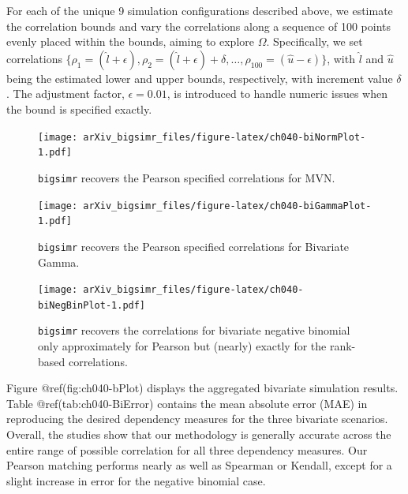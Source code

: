 \documentclass{article}
\begin{document}
For each of the unique 9 simulation configurations described above, we
estimate the correlation bounds and vary the correlations along a
sequence of 100 points evenly placed within the bounds, aiming to
explore \(\Omega\). Specifically, we set correlations
\(\{ \rho_1 = ( \hat{l} + \epsilon), \rho_2 = (\hat{l} + \epsilon) + \delta, \ldots, \rho_{100} = (\hat{u} - \epsilon) \}\),
with \(\hat{l}\) and \(\hat{u}\) being the estimated lower and upper
bounds, respectively, with increment value \(\delta\). The adjustment
factor, \(\epsilon=0.01\), is introduced to handle numeric issues when
the bound is specified exactly.

\begin{figure}
\centering
\texttt{[image: arXiv\_bigsimr\_files/figure-latex/ch040-biNormPlot-1.pdf]}
\caption{\texttt{bigsimr} recovers the Pearson specified correlations
for MVN.}
\end{figure}

\begin{figure}
\centering
\texttt{[image: arXiv\_bigsimr\_files/figure-latex/ch040-biGammaPlot-1.pdf]}
\caption{\texttt{bigsimr} recovers the Pearson specified correlations
for Bivariate Gamma.}
\end{figure}

\begin{figure}
\centering
\texttt{[image: arXiv\_bigsimr\_files/figure-latex/ch040-biNegBinPlot-1.pdf]}
\caption{\texttt{bigsimr} recovers the correlations for bivariate
negative binomial only approximately for Pearson but (nearly) exactly
for the rank-based correlations.}
\end{figure}

Figure @ref(fig:ch040-bPlot) displays the aggregated bivariate
simulation results. Table @ref(tab:ch040-BiError) contains the mean
absolute error (MAE) in reproducing the desired dependency measures for
the three bivariate scenarios. Overall, the studies show that our
methodology is generally accurate across the entire range of possible
correlation for all three dependency measures. Our Pearson matching
performs nearly as well as Spearman or Kendall, except for a slight
increase in error for the negative binomial case.
\end{document}
